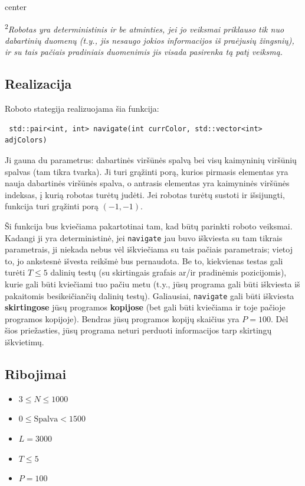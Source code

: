 \documentclass[12pt]{article}
\begin{document}
\begin{adjustbox}{center}
	
\end{adjustbox}

\textsuperscript{2}\textit{Robotas yra deterministinis ir be atminties, jei jo veiksmai priklauso tik nuo dabartinių duomenų (t.y., jis nesaugo jokios informacijos iš praėjusių žingsnių), ir su tais pačiais pradiniais duomenimis jis visada pasirenka tą patį veiksmą.}

\subsection{Realizacija}
Roboto stategija realizuojama šia funkcija:
\begin{lstlisting}
 std::pair<int, int> navigate(int currColor, std::vector<int> adjColors)
\end{lstlisting}

Ji gauna du parametrus: dabartinės viršūnės spalvą bei visų kaimyninių viršūnių spalvas (tam tikra tvarka). Ji turi grąžinti porą, kurios pirmasis elementas yra nauja dabartinės viršūnės spalva, o antrasis elementas yra kaimyninės viršūnės indeksas, į kurią robotas turėtų judėti. Jei robotas turėtų sustoti ir išsijungti, funkcija turi grąžinti porą $(-1, -1)$.

Ši funkcija bus kviečiama pakartotinai tam, kad būtų parinkti roboto veiksmai. Kadangi ji yra deterministinė, jei \texttt{navigate} jau buvo iškviesta su tam tikrais parametrais, ji niekada nebus vėl iškviečiama su tais pačiais parametrais; vietoj to, jo ankstesnė išvesta reikšmė bus pernaudota. Be to, kiekvienas testas gali turėti $T \leq 5$ dalinių testų (su skirtingais grafais ar/ir pradinėmis pozicijomis), kurie gali būti kviečiami tuo pačiu metu (t.y., jūsų programa gali būti iškviesta iš pakaitomis besikeičiančių dalinių testų). Galiausiai, \texttt{navigate} gali būti iškviesta \textbf{skirtingose} jūsų programos \textbf{kopijose} (bet gali būti kviečiama ir toje pačioje programos kopijoje). Bendras jūsų programos kopijų skaičius yra $P = 100$. Dėl šios priežasties, jūsų programa neturi perduoti informacijos tarp skirtingų iškvietimų.

\subsection{Ribojimai}

\begin{itemize}
\item $3 \leq N \leq 1000$
\item $0 \leq \mathrm{Spalva} < 1500$
\item $L = 3000$
\item $T \leq 5$
\item $P = 100$
\end{itemize}
\end{document}
